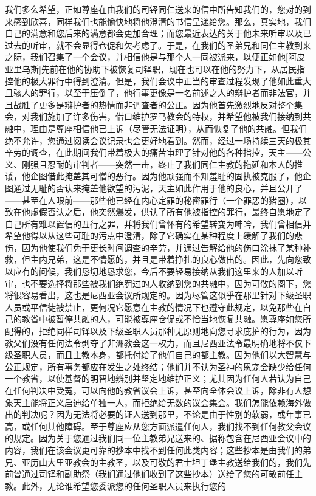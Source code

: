 我们多么希望，正如尊座在由我们的司铎同仁送来的信中所告知我们的，您对的到来感到欣喜，同样我们也能愉快地将他澄清的书信呈递给您。那么，真实地，我们自己的满意和您后来的满意都会更加合理；而您最近表达的关于他未来听审以及已过去的听审，就不会显得仓促和欠考虑了。于是，在我们的圣弟兄和同仁主教到来之际，我们召集了一个会议，并相信他是与那个人一同被派来，以便正如他[阿皮亚里乌斯]先前在他的协助下被恢复司铎职，现在也可以在他的努力下，从居民指控他的极大罪行中得到澄清。但是，我们会议中正当的审查过程发现了他如此重大且骇人的罪行，以至于压倒了，他行事更像是一名前述之人的辩护者而非法官，并且战胜了更多是辩护者的热情而非调查者的公正。因为他首先激烈地反对整个集会，对我们施加了许多伤害，借口维护罗马教会的特权，并希望他被我们接纳到共融中，理由是尊座相信他已上诉（尽管无法证明），从而恢复了他的共融。但我们绝不允许，您通过阅读会议记录也会更好地看到。然而，经过一场持续三天的极其辛劳的调查，在此期间我们带着极大的痛苦审理了针对他的各种指控，天主——公义、刚强且忍耐的审判者——突然一击，终止了我们同仁主教的拖延和本人的推诿，他企图借此掩盖其可憎的恶行。因为他顽强而不知羞耻的固执被克服了，他企图通过无耻的否认来掩盖他欲望的污泥，天主如此作用于他的良心，并且公开了——甚至在人眼前——那些他已经在内心定罪的秘密罪行（一个罪恶的猪圈），以致在他虚假否认之后，他突然爆发，供认了所有他被指控的罪行，最终自愿地定了自己所有难以置信的丑行之罪，并将我们曾怀有的希望转变为呻吟，我们曾相信并希望他得以从这些可耻的污点中澄清，除了它确实在某种程度上缓解了我们的悲伤，因为他使我们免于更长时间调查的辛劳，并通过告解给他的伤口涂抹了某种补救，但主内兄弟，这是不情愿的，并且是带着挣扎的良心做出的。因此，先向您致以应有的问候，我们恳切地恳求您，今后不要轻易接纳从我们这里来的人加以听审，也不要选择将那些被我们绝罚过的人收纳到您的共融中，因为可敬的阁下，您将很容易看出，这也是尼西亚会议所规定的。因为尽管这似乎在那里针对下级圣职人员或平信徒被禁止，更何况它愿意在主教的情况下也遵守此规定，以免那些在自己的教省中被暂停共融的人，可能被尊座仓促或不恰当地恢复共融。愿尊座如您所配得的，拒绝同样司铎以及下级圣职人员那种无原则地向您寻求庇护的行为，因为教父们没有任何法令剥夺了非洲教会这一权力，而且尼西亚法令最明确地将不仅下级圣职人员，而且主教本身，都托付给了他们自己的都主教。因为他们以大智慧与公正规定，所有事务都应在发生之处终结；他们并不认为圣神的恩宠会缺少给任何一个教省，以使基督的明智地辨别并坚定地维护正义；尤其因为任何人若认为自己在任何判决中受冤，可以向他的教省议会上诉，甚至向全体会议上诉，除非有人想象天主能将正义启迪给单独一人，而拒绝给无数的议会集会。我们怎能依赖海外做出的判决呢？因为无法将必要的证人送到那里，不论是由于性别的软弱，或年事已高，或任何其他障碍。至于尊座应从您方面派遣任何人，我们找不到任何教父会议的规定。因为关于您通过我们同一位主教弟兄送来的、据称包含在尼西亚会议中的内容，我们在该会议更可靠的抄本中找不到任何此类内容；这些抄本是由我们的弟兄、亚历山大里亚教会的主教圣，以及可敬的君士坦丁堡主教送给我们的，我们先前曾通过司铎和副助祭（我们通过他们收到了这些抄本）送给了您的可敬前任主教。此外，无论谁希望您委派您的任何圣职人员来执行您的